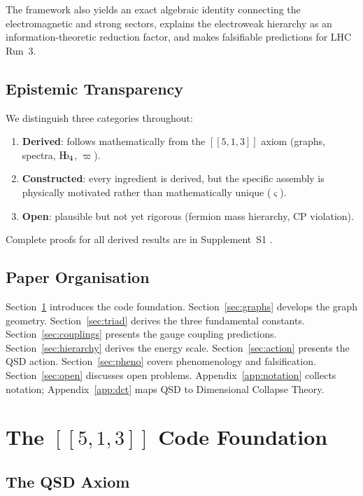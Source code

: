 \documentclass[11pt,a4paper]{article}
\theoremstyle{definition}
\newcommand{\Hb}{\textnormal{H\kern-0.3em b}}
\newcommand{\Hbfour}{\Hb_4}
\newcommand{\strain}{\varsigma}
\newcommand{\specbond}{\varpi}
\begin{document}
The framework also yields an exact algebraic identity connecting the electromagnetic and strong sectors, explains the electroweak hierarchy as an information-theoretic reduction factor, and makes falsifiable predictions for LHC Run~3.

\subsection{Epistemic Transparency}

We distinguish three categories throughout:
\begin{enumerate}[nosep]
    \item \textbf{Derived}: follows mathematically from the $[[5,1,3]]$ axiom (graphs, spectra, $\Hbfour$, $\specbond$).
    \item \textbf{Constructed}: every ingredient is derived, but the specific assembly is physically motivated rather than mathematically unique ($\strain$).
    \item \textbf{Open}: plausible but not yet rigorous (fermion mass hierarchy, CP violation).
\end{enumerate}
Complete proofs for all derived results are in Supplement~S1 \cite{Hubka2026QSDsupp}.

\subsection{Paper Organisation}

Section~\ref{sec:code} introduces the code foundation. Section~\ref{sec:graphs} develops the graph geometry. Section~\ref{sec:triad} derives the three fundamental constants. Section~\ref{sec:couplings} presents the gauge coupling predictions. Section~\ref{sec:hierarchy} derives the energy scale. Section~\ref{sec:action} presents the QSD action. Section~\ref{sec:pheno} covers phenomenology and falsification. Section~\ref{sec:open} discusses open problems. Appendix~\ref{app:notation} collects notation; Appendix~\ref{app:dct} maps QSD to Dimensional Collapse Theory.

\section{The $[[5,1,3]]$ Code Foundation}
\label{sec:code}

\subsection{The QSD Axiom}
\end{document}
